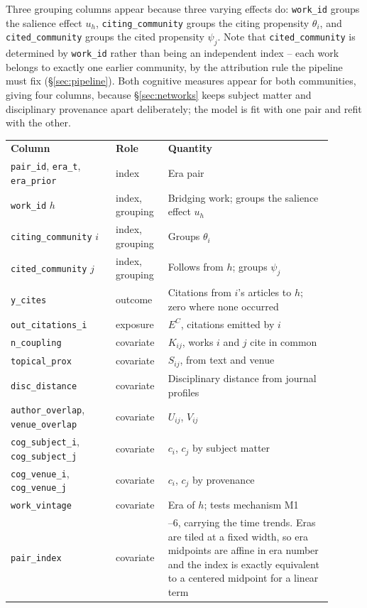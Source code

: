 \documentclass[11pt]{article}
\newcommand{\doublerule}{%
  \specialrule{\lightrulewidth}{0pt}{\doublerulesep}%
  \specialrule{\lightrulewidth}{0pt}{0pt}}
\newcommand{\code}[1]{\texttt{\small #1}}
\begin{document}
Three grouping columns appear because three varying effects do: \code{work\_id} groups the
salience effect $u_h$, \code{citing\_community} groups the citing propensity $\theta_i$, and
\code{cited\_community} groups the cited propensity $\psi_j$. Note that \code{cited\_community}
is determined by \code{work\_id} rather than being an independent index -- each work belongs to
exactly one earlier community, by the attribution rule the pipeline must fix
(\S\ref{sec:pipeline}). Both cognitive measures appear for both communities, giving four
columns, because \S\ref{sec:networks} keeps subject matter and disciplinary provenance apart
deliberately; the model is fit with one pair and refit with the other.

\begin{center}
\small
\begin{longtable}{@{}>{\raggedright\arraybackslash}p{0.30\linewidth}>{\raggedright\arraybackslash}p{0.13\linewidth}>{\raggedright\arraybackslash}p{0.47\linewidth}@{}}
\toprule
\textbf{Column} & \textbf{Role} & \textbf{Quantity}\\
\doublerule
\endhead
\code{pair\_id}, \code{era\_t}, \code{era\_prior} & index & Era pair\\
\code{work\_id} $h$ & index, grouping & Bridging work; groups the salience effect $u_h$\\
\code{citing\_community} $i$ & index, grouping & Groups $\theta_i$\\
\code{cited\_community} $j$ & index, grouping & Follows from $h$; groups $\psi_j$\\
\midrule
\code{y\_cites} & outcome & Citations from $i$'s articles to $h$; zero where none occurred\\
\midrule
\code{out\_citations\_i} & exposure & $E^{C}$, citations emitted by $i$\\
\midrule
\code{n\_coupling} & covariate & $K_{ij}$, works $i$ and $j$ cite in common\\
\code{topical\_prox} & covariate & $S_{ij}$, from text and venue\\
\code{disc\_distance} & covariate & Disciplinary distance from journal profiles\\
\code{author\_overlap}, \code{venue\_overlap} & covariate & $U_{ij}$, $V_{ij}$\\
\code{cog\_subject\_i}, \code{cog\_subject\_j} & covariate & $c_i$, $c_j$ by subject matter\\
\code{cog\_venue\_i}, \code{cog\_venue\_j} & covariate & $c_i$, $c_j$ by provenance\\
\code{work\_vintage} & covariate & Era of $h$; tests mechanism M1\\
\code{pair\_index} & covariate & 1--6, carrying the time trends. Eras are tiled at a fixed
  width, so era midpoints are affine in era number and the index is exactly equivalent to a
  centered midpoint for a linear term\\
\bottomrule
\end{longtable}
\end{center}
\end{document}
